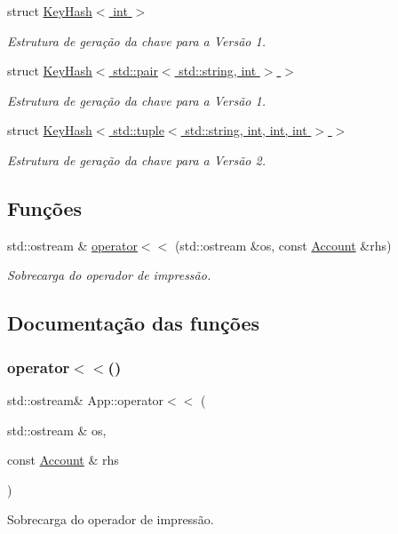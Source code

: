 \begin{DoxyCompactItemize}
struct \hyperlink{structApp_1_1KeyHash_3_01int_01_4}{Key\+Hash$<$ int $>$}
\begin{DoxyCompactList}\small\item\em Estrutura de geração da chave para a Versão 1. \end{DoxyCompactList}\item 
struct \hyperlink{structApp_1_1KeyHash_3_01std_1_1pair_3_01std_1_1string_00_01int_01_4_01_4}{Key\+Hash$<$ std\+::pair$<$ std\+::string, int $>$ $>$}
\begin{DoxyCompactList}\small\item\em Estrutura de geração da chave para a Versão 1. \end{DoxyCompactList}\item 
struct \hyperlink{structApp_1_1KeyHash_3_01std_1_1tuple_3_01std_1_1string_00_01int_00_01int_00_01int_01_4_01_4}{Key\+Hash$<$ std\+::tuple$<$ std\+::string, int, int, int $>$ $>$}
\begin{DoxyCompactList}\small\item\em Estrutura de geração da chave para a Versão 2. \end{DoxyCompactList}\end{DoxyCompactItemize}
\subsection*{Funções}
\begin{DoxyCompactItemize}
\item 
std\+::ostream \& \hyperlink{namespaceApp_a18630abff157de6ff6d7842aedc4c59c}{operator$<$$<$} (std\+::ostream \&os, const \hyperlink{structApp_1_1Account}{Account} \&rhs)
\begin{DoxyCompactList}\small\item\em Sobrecarga do operador de impressão. \end{DoxyCompactList}\end{DoxyCompactItemize}


\subsection{Documentação das funções}
\mbox{\label{namespaceApp_a18630abff157de6ff6d7842aedc4c59c}} 
\subsubsection{\texorpdfstring{operator$<$$<$()}{operator<<()}}
{\footnotesize\ttfamily std\+::ostream\& App\+::operator$<$$<$ (\begin{DoxyParamCaption}\item[{std\+::ostream \&}]{os,  }\item[{const \hyperlink{structApp_1_1Account}{Account} \&}]{rhs }\end{DoxyParamCaption})}



Sobrecarga do operador de impressão. 

